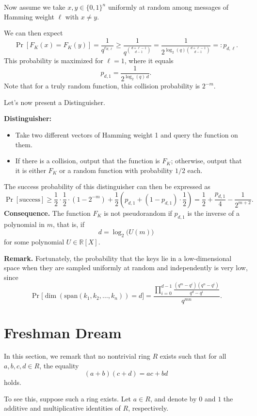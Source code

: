 \documentclass{article}
\begin{document}
Now assume we take $x, y \in \{0,1\}^n$ uniformly at random among messages of Hamming weight $\ell$ with $x \neq y$.

We can then expect
\[
\Pr[F_K(x) = F_K(y)] = \frac{1}{q^{c_{d,\ell}}} \geq \frac{1}{q^{\binom{d+\ell-1}{d-1}}} = \frac{1}{2^{\log_2(q)\binom{d+\ell-1}{d-1}}} =: p_{d,\ell}.
\]
This probability is maximized for $\ell=1$, where it equals
\[
p_{d,1} = \frac{1}{2^{\log_2(q)\, d}}.
\]
Note that for a truly random function, this collision probability is $2^{-m}$.

Let's now present a Distinguisher.
\medskip

\textbf{Distinguisher:}
\begin{itemize}
    \item Take two different vectors of Hamming weight 1 and query the function on them.
    \item If there is a collision, output that the function is $F_K$; otherwise, output that it is either $F_K$ or a random function with probability $1/2$ each.
\end{itemize}

\medskip

The success probability of this distinguisher can then be expressed as
\[
\Pr[\text{success}] \geq \frac{1}{2} \cdot \frac{1}{2} \cdot \left(1 - 2^{-m}\right) 
+ \frac{1}{2} \left( p_{d,1} + (1 - p_{d,1}) \cdot \frac{1}{2} \right) = \frac{1}{2} + \frac{p_{d,1}}{4} - \frac{1}{2^{m+2}}.
\]
\textbf{Consequence.}  
The function $F_K$ is not pseudorandom if $p_{d,1}$ is the inverse of a polynomial in $m$, that is, if 
\[
d = \log_2 \bigl( U(m) \bigr)
\]
for some polynomial $U \in \mathbb{R}[X]$.

\textbf{Remark.}  
Fortunately, the probability that the keys lie in a low-dimensional space when they are sampled uniformly at random and independently is very low, since
\[
\Pr\bigl[\dim(\mathrm{span}(k_1, k_2, \dots, k_n)) = d \bigr]
= \frac{\prod_{i=0}^{d-1} \frac{(q^m - q^i)(q^n - q^i)}{q^d - q^i}}{q^{mn}}.
\]

\section{Freshman Dream}

In this section, we remark that no nontrivial ring $R$ exists such that for all $a,b,c,d \in R$, the equality
\[
(a+b)(c+d) = ac + bd
\]
holds.

To see this, suppose such a ring exists. Let $a \in R$, and denote by $0$ and $1$ the additive and multiplicative identities of $R$, respectively.
\end{document}

